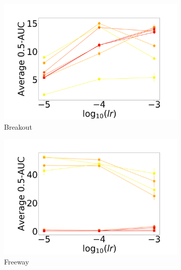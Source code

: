 \documentclass{article}
\begin{document}
\begin{figure}[!ht]
  \begin{subfigure}[b]{0.25\linewidth}
    \centering
    \includegraphics[width=\columnwidth]{figs/deep/discrete/sensitivity/UNLABELED_kl_auc-0.5_breakout_lr_sensitivity.png} 
    \caption{Breakout
    }\label{fig:breakout}
  \end{subfigure}%
  \begin{subfigure}[b]{0.25\linewidth}
    \centering
    \includegraphics[width=\columnwidth]{figs/deep/discrete/sensitivity/UNLABELED_kl_auc-0.5_freeway_lr_sensitivity.png} 
    \caption{Freeway
    }\label{fig:freeway}
  \end{subfigure}%
  \begin{subfigure}[b]{0.25\linewidth}
    \centering

\end{subfigure}
\end{figure}
\end{document}
